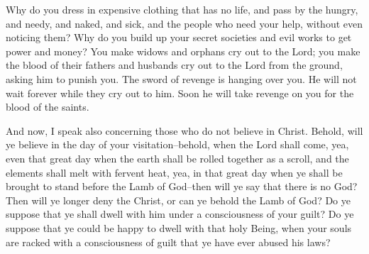 \bverse \iffalse Why do ye adorn yourselves with that which hath no life, and yet suffer the hungry, and the needy, and the naked, and the sick and the afflicted to pass by you, and notice them not? \fi
Why do you dress in expensive clothing that has no life, and pass by the hungry, and needy, and naked, and sick, and the people who need your help, without even noticing them?
\bverse \iffalse Yea, why do ye build up your secret abominations to get gain, and cause that widows should mourn before the Lord, and also orphans to mourn before the Lord, and also the blood of their fathers and their husbands to cry unto the Lord from the ground, for vengeance upon your heads? \fi
Why do you build up your secret societies and evil works to get power and money? You make widows and orphans cry out to the Lord; you make the blood of their fathers and husbands cry out to the Lord from the ground, asking him to punish you.
\bverse \iffalse Behold, the sword of vengeance hangeth over you; and the time soon cometh that he avengeth the blood of the saints upon you, for he will not suffer their cries any longer. \fi
The sword of revenge is hanging over you. He will not wait forever while they cry out to him. Soon he will take revenge on you for the blood of the saints.
\bchapter
\iffalse And now, I speak also concerning those who do not believe in Christ. \fi
And now, I speak also concerning those who do not believe in Christ.
\bverse \iffalse Behold, will ye believe in the day of your visitation--behold, when the Lord shall come, yea, even that great day when the earth shall be rolled together as a scroll, and the elements shall melt with fervent heat, yea, in that great day when ye shall be brought to stand before the Lamb of God--then will ye say that there is no God? \fi
Behold, will ye believe in the day of your visitation--behold, when the Lord shall come, yea, even that great day when the earth shall be rolled together as a scroll, and the elements shall melt with fervent heat, yea, in that great day when ye shall be brought to stand before the Lamb of God--then will ye say that there is no God?
\bverse \iffalse Then will ye longer deny the Christ, or can ye behold the Lamb of God? Do ye suppose that ye shall dwell with him under a consciousness of your guilt? Do ye suppose that ye could be happy to dwell with that holy Being, when your souls are racked with a consciousness of guilt that ye have ever abused his laws? \fi
Then will ye longer deny the Christ, or can ye behold the Lamb of God? Do ye suppose that ye shall dwell with him under a consciousness of your guilt? Do ye suppose that ye could be happy to dwell with that holy Being, when your souls are racked with a consciousness of guilt that ye have ever abused his laws?
